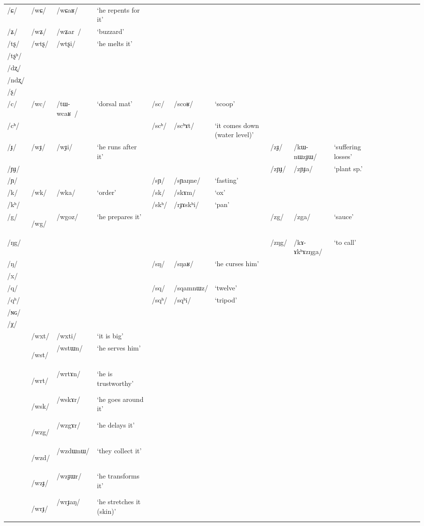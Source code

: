 \documentclass[oneside,a4paper,11pt]{article}
\newcommand{\ipa}[1]{\mbox{\phon/#1/}}
\newcommand{\deux}[1]{\ipa{#1}\addtocounter{2clusters}{1}}
\newcommand{\trois}[1]{\ipa{#1}\addtocounter{3clusters}{1}}
\newcommand{\tib}[1]{\cellcolor{lightgray}\textbf{#1}}
\begin{document}
\begin{table}
{\begin{tabular}{lllllllllllllllll}
\ipa{ɕ} & \deux{wɕ} & \ipa{wɕaʁ} & `he repents for it' & & & & & & & \\ 
\ipa{ʑ} & \deux{wʑ} & \ipa{wʑar } & `buzzard' & & & & & & & \\
\ipa{tʂ} & \deux{wtʂ} & \ipa{wtʂi} & `he melts it' & & & & & & & \\
\ipa{tʂʰ} & & & & & & & & & & \\
\ipa{dʐ} & & & & & & & & & & \\
\ipa{ndʐ} & & & & & & & & & & \\
\ipa{ʂ} & & & & & & & & & & \\
\ipa{c} & \deux{wc} & \ipa{tɯ-wcaʁ } & `dorsal mat' & \deux{sc} & \ipa{scoʁ} & `scoop' & & & & \\
\ipa{cʰ} & & & & \deux{scʰ} & \ipa{scʰɤt} & `it comes down (water level)' & & & & \\
\ipa{ɟ} & \deux{wɟ} & \ipa{wɟi} & `he runs after it' & & & & \deux{zɟ} & \ipa{kɯ-nɯzɟɯ} & `suffering losses' & \\
\ipa{ɲɟ} & & & & & & & \deux{zɲɟ} & \ipa{zɲɟa} & `plant sp.' & \\
\ipa{ɲ} & & & & \deux{sɲ} & \ipa{sɲaŋne} & `fasting' & & & & \\
\ipa{k} & \deux{wk} & \ipa{wka} & `order' & \deux{sk} & \ipa{skɤm} & `ox' & & & & \\
\ipa{kʰ} & & & & \deux{skʰ} & \ipa{rɟɤskʰi} & `pan' & & & & \\
\ipa{g} & \deux{wg}  \tib{}& \ipa{wgoz} & `he prepares it' & & & & \deux{zg} & \ipa{zga} & `sauce' & \\
\ipa{ŋg} & & & & & & & \deux{zŋg} & \ipa{kɤ-ɤkʰɤzŋga} & `to call' & \\
\ipa{ŋ} & & & & \deux{sŋ} & \ipa{sŋaʁ} & `he curses him' & & & & \\
\ipa{x} & & & & & & & & & & \\
\ipa{q} & & & & \deux{sq} & \ipa{sqamnɯz} & `twelve' & & & & \\
\ipa{qʰ} & & & & \deux{sqʰ} & \ipa{sqʰi} & `tripod' & & & & \\
\ipa{ɴɢ} & & & & & & & & & & \\
\ipa{χ} & & & & & & & & & & \\
\midrule
& \trois{wxt} & \ipa{wxti} & `it is big' \\
& \trois{wst} \tib{} & \ipa{wstɯn} & `he serves him' \\
& \trois{wrt}  \tib{} & \ipa{wrtɤn} & `he is trustworthy'\\
& \trois{wsk}  \tib{} & \ipa{wskɤr} & `he goes around it' \\
& \trois{wzg}  \tib{} & \ipa{wzgɤr} & `he delays it' \\
& \trois{wzd}  \tib{} & \ipa{wzdɯnɯ} & `they collect it' \\
& \trois{wzɟ}  \tib{} & \ipa{wzɟɯr} & `he transforms it' \\
& \trois{wrɟ}  \tib{} & \ipa{wrɟaŋ} & `he stretches it (skin)' \\
\bottomrule
\end{tabular}} 
\end{table}
\end{document}
